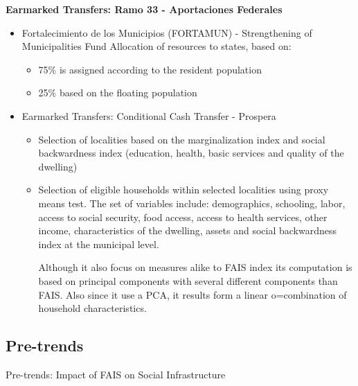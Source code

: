 \documentclass[dv_diss_main.tex]{subfiles}
\begin{document}
{\bf Earmarked Transfers: Ramo 33 - Aportaciones Federales}
\begin{itemize}

\item 	Fortalecimiento de los Municipios (FORTAMUN) - Strengthening of Municipalities Fund
Allocation of resources to states, based on:
   \begin{itemize}
   \item 75\% is assigned according to the resident population
   \item 25\% based on the floating population 
        
   \end{itemize}

\item Earmarked Transfers: Conditional Cash Transfer - Prospera
   \begin{itemize}
   \item Selection of localities based on the marginalization index and social backwardness index (education, health, basic services and quality of the dwelling)
   \item Selection of eligible households within selected localities using proxy means test. The set of variables include: demographics, schooling, labor, access to social security, food access, access to health services, other income, characteristics of the dwelling, assets and social backwardness index at the municipal level. 
   
   Although it also focus on measures alike to FAIS index its computation is based on principal components with several different components than FAIS. Also since it use a PCA, it results form a linear o=combination of household characteristics.  

   \end{itemize}

\end{itemize}

\subsection{Pre-trends}\label{ap:c}



\begin{table}[H]
	\centering
	\small
	\caption{Pre-trends: Impact of FAIS on Social Infrastructure}
	\label{trends_inf}
	\resizebox{11cm}{!}{
		
				}		
\parbox{\textwidth}{\small 
\vspace{2eX}
\footnotesize	
 \maintable
 \trend 
}
\end{table}
\end{document}
